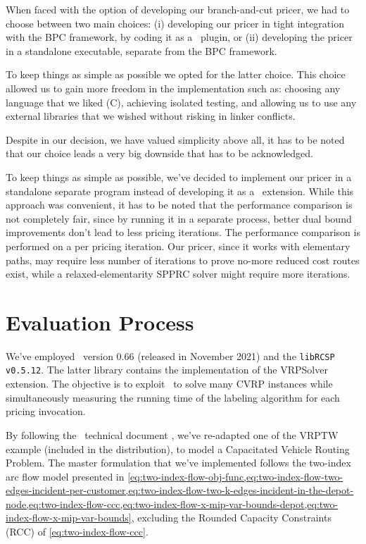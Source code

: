 
When faced with the option of developing our branch-and-cut pricer,
we had to choose between two main choices:
(i) developing our pricer in tight integration with the BPC framework,
by coding it as a \bapcod\ plugin,
or (ii) developing the pricer in a standalone executable,
separate from the BPC framework.

To keep things as simple as possible we opted for the latter choice.
This choice allowed us to gain more freedom in the implementation
such as: choosing any language that we liked (C),
achieving isolated testing,
and allowing us to use any external libraries
that we wished without risking in linker conflicts.

Despite in our decision, we have valued simplicity above all,
it has to be noted that our choice leads a very big downside that has to be acknowledged.

To keep things as simple as possible, we've decided to implement our
pricer in a standalone separate program instead of developing it as a \bapcod\ extension.
While this approach was convenient, it has to be noted that the performance comparison is not
completely fair, since by running it in a separate process, better dual bound improvements
don't lead to less pricing iterations.
The performance comparison is performed on a per pricing iteration.
Our pricer, since it works with elementary paths, may require less number of iterations
to prove no-more reduced cost routes exist, while a relaxed-elementarity SPPRC solver
might require more iterations.

\section{Evaluation Process}
\label{sec:results-evaluation-process}

We've employed \bapcod\ version 0.66 (released in November 2021) and the \texttt{libRCSP v0.5.12}.
The latter library contains the implementation of the VRPSolver extension.
The objective is to exploit \bapcod\ to solve many CVRP instances while simultaneously
measuring the running time of the labeling algorithm for each pricing invocation.

\medskip

By following the \bapcod\ technical document \parencite{sadykov2021},
we've re-adapted one of the VRPTW example (included in the distribution),
to model a Capacitated Vehicle Routing Problem.
The master formulation that we've implemented follows the two-index arc flow model
presented in \cref{eq:two-index-flow-obj-func,eq:two-index-flow-two-edges-incident-per-customer,eq:two-index-flow-two-k-edges-incident-in-the-depot-node,eq:two-index-flow-ccc,eq:two-index-flow-x-mip-var-bounds-depot,eq:two-index-flow-x-mip-var-bounds},
excluding the Rounded Capacity Constraints (RCC) of \cref{eq:two-index-flow-ccc}.

